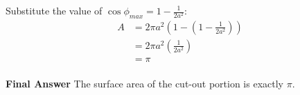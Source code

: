 \documentclass{article}
\begin{document}
Substitute the value of $\cos\phi_{max} = 1 - \frac{1}{2a^2}$:
\begin{align*}
	A & = 2\pi a^2 \left( 1 - \left( 1 - \frac{1}{2a^2} \right) \right) \\
	  & = 2\pi a^2 \left( \frac{1}{2a^2} \right)                        \\
	  & = \pi
\end{align*}
\\
\textbf{Final Answer} The surface area of the cut-out portion is exactly $\pi$.
\end{document}
